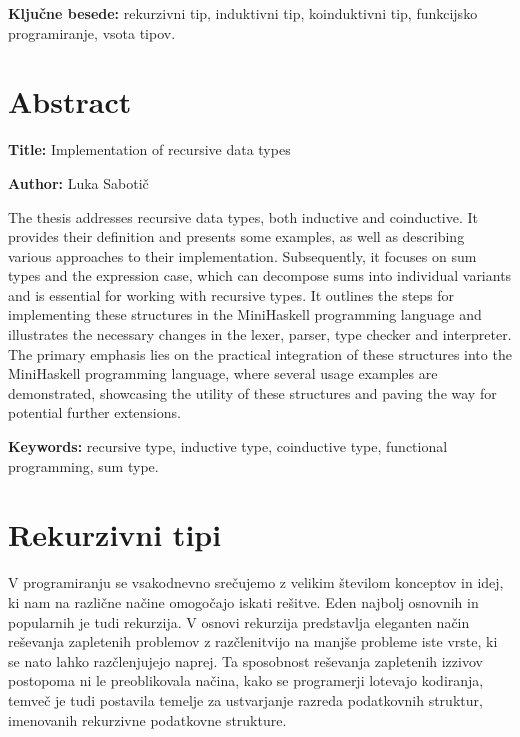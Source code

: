\documentclass[a4paper,12pt,openright]{book}
\newcommand{\ttitleEn}{Implementation of recursive data types}
\newcommand{\tauthor}{Luka Sabotič}
\newcommand{\tkeywords}{rekurzivni tip, induktivni tip, koinduktivni tip, funkcijsko programiranje, vsota tipov}
\newcommand{\tkeywordsEn}{recursive type, inductive type, coinductive type, functional programming, sum type}
\newcommand{\clearemptydoublepage}{\newpage{\pagestyle{empty}\cleardoublepage}}
\begin{document}
\bigskip

\noindent\textbf{Ključne besede:} \tkeywords.
\clearemptydoublepage

{}
\chapter*{Abstract}

\noindent\textbf{Title:} \ttitleEn
\bigskip

\noindent\textbf{Author:} \tauthor
\bigskip

\noindent The thesis addresses recursive data types, both inductive and coinductive. It provides their definition and presents some examples, as well as 
describing various approaches to their implementation. Subsequently, it focuses on sum types and the expression case, which can 
decompose sums into individual variants and is essential for working with recursive types. It outlines the steps for implementing these 
structures in the MiniHaskell programming language and illustrates the necessary changes in the lexer, parser, type checker and interpreter. 
The primary emphasis lies on the practical integration of these structures into the MiniHaskell programming language, where several usage 
examples are demonstrated, showcasing the utility of these structures and paving the way for potential further extensions.
\bigskip

\noindent\textbf{Keywords:} \tkeywordsEn.
\clearemptydoublepage

\mainmatter
\setcounter{page}{1}
\pagestyle{fancy}

\chapter{Rekurzivni tipi}
V programiranju se vsakodnevno srečujemo z velikim številom konceptov in idej, ki nam na različne načine omogočajo iskati rešitve. Eden najbolj osnovnih in popularnih je tudi rekurzija.
V osnovi rekurzija predstavlja eleganten način reševanja zapletenih problemov z razčlenitvijo na manjše probleme iste vrste, ki se nato lahko razčlenjujejo naprej. Ta sposobnost reševanja zapletenih izzivov 
postopoma ni le preoblikovala načina, kako se programerji lotevajo kodiranja, temveč je tudi postavila temelje za ustvarjanje razreda podatkovnih struktur, imenovanih rekurzivne podatkovne strukture.
\end{document}
